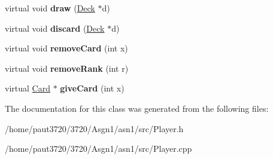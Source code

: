 \begin{DoxyCompactItemize}
\item 
\hypertarget{class_player_a4b193ee70b3b5b6f41b05eb729e5ee44}{virtual void {\bfseries draw} (\hyperlink{class_deck}{Deck} $\ast$d)}\label{class_player_a4b193ee70b3b5b6f41b05eb729e5ee44}

\item 
\hypertarget{class_player_a0cf53f7aa0d1f9abbabb230a08ab1d20}{virtual void {\bfseries discard} (\hyperlink{class_deck}{Deck} $\ast$d)}\label{class_player_a0cf53f7aa0d1f9abbabb230a08ab1d20}

\item 
\hypertarget{class_player_aeb5844d56fc8f3ce0042bbc1cf38088d}{virtual void {\bfseries remove\-Card} (int x)}\label{class_player_aeb5844d56fc8f3ce0042bbc1cf38088d}

\item 
\hypertarget{class_player_a340e268e06ecef5f1623bdfae3aa2513}{virtual void {\bfseries remove\-Rank} (int r)}\label{class_player_a340e268e06ecef5f1623bdfae3aa2513}

\item 
\hypertarget{class_player_a731ed3b0f2dd66e8fefe58be122e5b2e}{virtual \hyperlink{class_card}{Card} $\ast$ {\bfseries give\-Card} (int x)}\label{class_player_a731ed3b0f2dd66e8fefe58be122e5b2e}

\end{DoxyCompactItemize}


The documentation for this class was generated from the following files\-:\begin{DoxyCompactItemize}
\item 
/home/paut3720/3720/\-Asgn1/asn1/src/Player.\-h\item 
/home/paut3720/3720/\-Asgn1/asn1/src/Player.\-cpp\end{DoxyCompactItemize}
